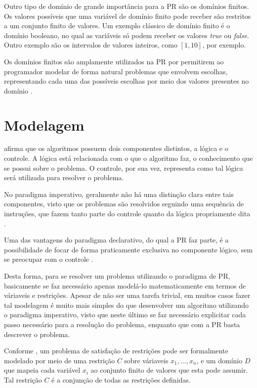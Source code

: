 Outro tipo de domínio de grande importância para a PR são os domínios finitos. Os valores possíveis que uma variável de domínio finito pode receber são restritos a um conjunto finito de valores. Um exemplo clássico de domínio finito é o domínio booleano, no qual as variáveis só podem receber os valores \textit{true} ou \textit{false}. Outro exemplo são os intervalos de valores inteiros, como $[1,10]$, por exemplo.

Os domínios finitos são amplamente utilizados na PR por permitirem ao programador modelar de forma natural problemas que envolvem escolhas, representando cada uma das possíveis escolhas por meio dos valores presentes no domínio \cite{stuckey}.



\section{Modelagem}
\label{sc-modelagem}

\cite{kowalski} afirma que os algoritmos possuem dois componentes distintos, a lógica e o controle. A lógica está relacionada com o que o algoritmo faz, o conhecimento que se possui sobre o problema. O controle, por sua vez, representa como tal lógica será utilizada para resolver o problema.

No paradigma imperativo, geralmente não há uma distinção clara entre tais componentes, visto que os problemas são resolvidos seguindo uma sequência de instruções, que fazem tanto parte do controle quanto da lógica propriamente dita \cite{thom}.

Uma das vantagens do paradigma declarativo, do qual a PR faz parte, é a possibilidade de focar de forma praticamente exclusiva no componente lógico, sem se preocupar com o controle \cite{thom}.

Desta forma, para se resolver um problema utilizando o paradigma de PR, basicamente se faz necessário apenas modelá-lo matematicamente em termos de váriaveis e restrições. Apesar de não ser uma tarefa trivial, em muitos casos fazer tal modelagem é muito mais simples do que desenvolver um algoritmo utilizando o paradigma imperativo, visto que neste último se faz necessário explicitar cada passo necessário para a resolução do problema, enquanto que com a PR basta descrever o problema.

Conforme \cite{stuckey}, um problema de satisfação de restrições pode ser formalmente modelado por meio de uma restrição $C$ sobre váriaveis $x_1, ..., x_n$, e um domínio $D$ que mapeia cada variável $x_i$ ao conjunto finito de valores que esta pode assumir. Tal restrição $C$ é a conjunção de todas as restrições definidas.

